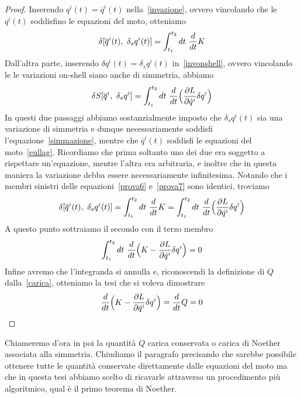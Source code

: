     \begin{proof}
        Inserendo $q^i(t) = \overline q^i(t)$ nella~\eqref{invazione}, ovvero vincolando che le $q^i(t)$ soddisfino le equazioni del moto, otteniamo 
    \begin{equation}\label{prova6}
        \delta[\overline q^i(t), ~\delta_s q^i(t)] = \int_{t_1}^{t_2}dt~ \frac{d}{dt} K
    \end{equation}
        Dall'altra parte, inserendo $\delta q^i(t) = \delta_s q^i(t)$ in~\eqref{invonshell}, ovvero vincolando le le variazioni on-shell siano anche di simmetria, abbiamo
    \begin{equation}\label{prova7}
        \delta S[\overline q^i,~\delta_s q^i] = \int_{t_1}^{t_2}dt~ \frac{d}{dt} \Big( \frac{\partial L}{\partial\dot q^i} \delta q^i \Big )
    \end{equation}
        In questi due passaggi abbiamo sostanzialmente imposto che $\delta_s q^i(t)$ sia una variazione di simmetria e dunque necessariamente soddisfi l'equazione~\eqref{simmazione}, mentre che $\overline q^i(t)$ soddisfi le equazioni del moto~\eqref{eullag}. Ricordiamo che prima soltanto uno dei due era soggetto a rispettare un'equazione, mentre l'altra era arbitraria, e inoltre che in questa maniera la variazione debba essere necessariamente infinitesima. Notando che i membri sinistri delle equazioni~\eqref{prova6} e~\eqref{prova7} sono identici, troviamo
    \begin{equation*}
        \delta[\overline q^i(t), ~\delta_s q^i(t)] = \int_{t_1}^{t_2}dt~ \frac{d}{dt} K = \int_{t_1}^{t_2}dt~ \frac{d}{dt} \Big( \frac{\partial L}{\partial\dot q^i} \delta q^i \Big )
    \end{equation*}
        A questo punto sottraiamo il secondo con il terzo membro
    \begin{equation*}
        \int_{t_1}^{t_2}dt~ \frac{d}{dt} \Big (K - \frac{\partial L}{\partial\dot q^i} \delta q^i \Big ) = 0
    \end{equation*}
        Infine avremo che l'integranda si annulla e, riconoscendi la definizione di $Q$ dalla~\eqref{carica}, otteniamo la tesi che si voleva dimostrare
    \begin{equation*}
        \frac{d}{dt} \Big (K - \frac{\partial L}{\partial\dot q^i} \delta q^i \Big ) = \frac{d}{dt} Q = 0
    \end{equation*}
    \end{proof}
    Chiameremo d'ora in poi la quantità $Q$ carica conservata o carica di Noether associata alla simmetria. Chiudiamo il paragrafo precisando che sarebbe possibile ottenere tutte le quantità conservate direttamente dalle equazioni del moto ma che in questa tesi abbiamo scelto di ricavarle attraverso un procedimento più algoritmico, qual è il primo teorema di Noether. 

